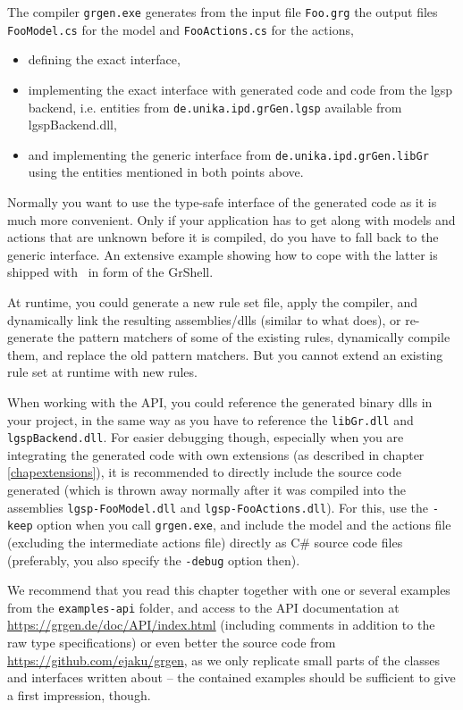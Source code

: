 \noindent The compiler \texttt{grgen.exe} generates from the input file \texttt{Foo.grg} the output files \texttt{FooModel.cs} for the model and \texttt{FooActions.cs} for the actions,
\begin{itemize}
\item defining the exact interface, 
\item implementing the exact interface with generated code and code from the lgsp backend, i.e. entities from \texttt{de.unika.ipd.grGen.lgsp} available from lgspBackend.dll, 
\item and implementing the generic interface from \texttt{de.unika.ipd.grGen.libGr} using the entities mentioned in both points above.
\end{itemize}

\noindent Normally you want to use the type-safe interface of the generated code as it is much more convenient.
Only if your application has to get along with models and actions that are unknown before it is compiled, do you have to fall back to the generic interface.
An extensive example showing how to cope with the latter is shipped with \GrG\ in form of the GrShell.

At runtime, you could generate a new rule set file, apply the compiler, and dynamically link the resulting assemblies/dlls (similar to what \GrShell{} does), or re-generate the pattern matchers of some of the existing rules, dynamically compile them, and replace the old pattern matchers.
But you cannot extend an existing rule set at runtime with new rules.

When working with the API, you could reference the generated binary dlls in your project, in the same way as you have to reference the \texttt{libGr.dll} and \texttt{lgspBackend.dll}.
For easier debugging though, especially when you are integrating the generated code with own extensions (as described in chapter \ref{chapextensions}), it is recommended to directly include the source code generated (which is thrown away normally after it was compiled into the assemblies \texttt{lgsp-FooModel.dll} and \texttt{lgsp-FooActions.dll}).
For this, use the \texttt{-keep} option when you call \texttt{grgen.exe}, and include the model and the actions file (excluding the intermediate actions file) directly as C\# source code files (preferably, you also specify the \texttt{-debug} option then).

We recommend that you read this chapter together with one or several examples from the \texttt{examples-api} folder, and access to the API documentation at \url{https://grgen.de/doc/API/index.html} (including comments in addition to the raw type specifications) or even better the source code from \url{https://github.com/ejaku/grgen}, as we only replicate small parts of the classes and interfaces written about -- the contained examples should be sufficient to give a first impression, though.



